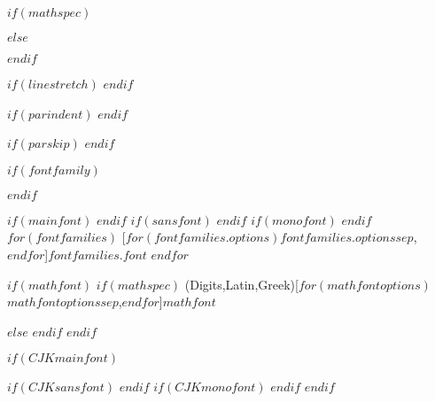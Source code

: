 \ifPDFTeX
  \usepackage{textcomp} %
\else %
$if(mathspec)$
  \ifXeTeX
    \usepackage{mathspec} %
  \else
    \usepackage{unicode-math} %
  \fi
$else$
  \usepackage{unicode-math}
$endif$
\fi


\makeatletter
\setlength{\@fptop}{0.5em} %
\makeatother

\setlength{\headsep}{1cm}
\setlength{\footskip}{1cm}
\checkandfixthelayout

\renewcommand{\familydefault}{\sfdefault}

$if(linestretch)$
\renewcommand{\baselinestretch}{$linestretch$}
$endif$

$if(parindent)$
\setlength{\parindent}{$parindent$}
$endif$

$if(parskip)$
\setlength{\parskip}{$parskip$}
$endif$

\setlength{\footnotemargin}{0.25cm}
\let\svfootnoterule\footnoterule
\renewcommand\footnoterule{\svfootnoterule\vspace{5pt}}

$if(fontfamily)$
\usepackage[$for(fontfamilyoptions)$$fontfamilyoptions$$sep$,$endfor$]{$fontfamily$}
$endif$

\ifPDFTeX\else
$if(mainfont)$
$endif$
$if(sansfont)$
$endif$
$if(monofont)$
$endif$
$for(fontfamilies)$
  [$for(fontfamilies.options)$$fontfamilies.options$$sep$,$endfor$]{$fontfamilies.font$}
$endfor$

$if(mathfont)$
$if(mathspec)$
  \ifXeTeX
    \setmathfont(Digits,Latin,Greek)[$for(mathfontoptions)$$mathfontoptions$$sep$,$endfor$]{$mathfont$}
  \else
  \fi

$else$
$endif$
$endif$

$if(CJKmainfont)$
  \ifXeTeX
    \usepackage{xeCJK}
$if(CJKsansfont)$
$endif$
$if(CJKmonofont)$
$endif$
  \fi
$endif$

